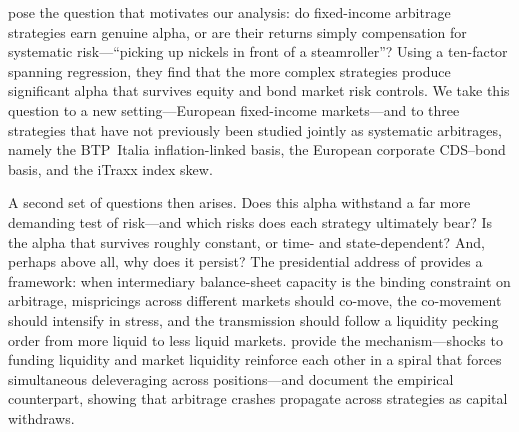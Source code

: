 
\citet{duarte2007risk} pose the question that motivates our analysis:
do fixed-income arbitrage strategies earn genuine alpha, or are their
returns simply compensation for systematic risk---``picking up nickels
in front of a steamroller''? Using a ten-factor spanning regression,
they find that the more complex strategies produce significant alpha
that survives equity and bond market risk controls. We take this
question to a new setting---European fixed-income markets---and to
three strategies that have not previously been studied jointly as
systematic arbitrages, namely the BTP~Italia inflation-linked basis,
the European corporate CDS--bond basis, and the iTraxx index skew.

A second set of questions then arises. Does this alpha withstand a far
more demanding test of risk---and which risks does each strategy
ultimately bear? Is the alpha that survives roughly constant, or time-
and state-dependent? And, perhaps above all, why does it persist? The
presidential address of \citet{duffie2010presidential} provides a
framework: when intermediary balance-sheet capacity is the binding
constraint on arbitrage, mispricings across different markets should
co-move, the co-movement should intensify in stress, and the
transmission should follow a liquidity pecking order from more liquid
to less liquid markets. \citet{brunnermeier2009market} provide the
mechanism---shocks to funding liquidity and market liquidity reinforce
each other in a spiral that forces simultaneous deleveraging across
positions---and \citet{mitchell2012arbitrage} document the empirical
counterpart, showing that arbitrage crashes propagate across strategies
as capital withdraws.

